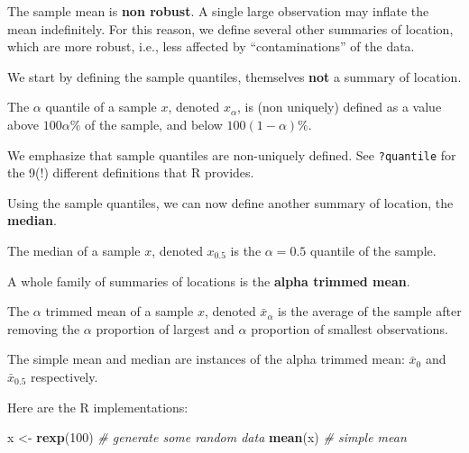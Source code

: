 \documentclass[]{book}
\newenvironment{Shaded}{\begin{snugshade}}{\end{snugshade}}
\newcommand{\KeywordTok}[1]{\textcolor[rgb]{0.13,0.29,0.53}{\textbf{#1}}}
\newcommand{\DecValTok}[1]{\textcolor[rgb]{0.00,0.00,0.81}{#1}}
\newcommand{\StringTok}[1]{\textcolor[rgb]{0.31,0.60,0.02}{#1}}
\newcommand{\CommentTok}[1]{\textcolor[rgb]{0.56,0.35,0.01}{\textit{#1}}}
\newcommand{\NormalTok}[1]{#1}
\theoremstyle{definition}
\theoremstyle{definition}
\theoremstyle{definition}
\theoremstyle{remark}
\let\BeginKnitrBlock\begin \let\EndKnitrBlock\end
\begin{document}
The sample mean is \textbf{non robust}. A single large observation may
inflate the mean indefinitely. For this reason, we define several other
summaries of location, which are more robust, i.e., less affected by
``contaminations'' of the data.

We start by defining the sample quantiles, themselves \textbf{not} a
summary of location.

\BeginKnitrBlock{definition}[Quantiles]
\protect\hypertarget{def:unnamed-chunk-99}{}{\label{def:unnamed-chunk-99}
{} }The \(\alpha\) quantile of a sample \(x\),
denoted \(x_\alpha\), is (non uniquely) defined as a value above
\(100 \alpha \%\) of the sample, and below \(100 (1-\alpha) \%\).
\EndKnitrBlock{definition}

We emphasize that sample quantiles are non-uniquely defined. See
\texttt{?quantile} for the 9(!) different definitions that R provides.

Using the sample quantiles, we can now define another summary of
location, the \textbf{median}.

\BeginKnitrBlock{definition}[Median]
\protect\hypertarget{def:unnamed-chunk-100}{}{\label{def:unnamed-chunk-100}
{} }The median of a sample \(x\), denoted
\(x_{0.5}\) is the \(\alpha=0.5\) quantile of the sample.
\EndKnitrBlock{definition}

A whole family of summaries of locations is the \textbf{alpha trimmed
mean}.

\BeginKnitrBlock{definition}[Alpha Trimmed Mean]
\protect\hypertarget{def:unnamed-chunk-101}{}{\label{def:unnamed-chunk-101}
{} }The \(\alpha\) trimmed mean of a
sample \(x\), denoted \(\bar x_\alpha\) is the average of the sample
after removing the \(\alpha\) proportion of largest and \(\alpha\)
proportion of smallest observations.
\EndKnitrBlock{definition}

The simple mean and median are instances of the alpha trimmed mean:
\(\bar x_0\) and \(\bar x_{0.5}\) respectively.

Here are the R implementations:

\begin{Shaded}
\begin{Highlighting}[]
\NormalTok{x <-}\StringTok{ }\KeywordTok{rexp}\NormalTok{(}\DecValTok{100}\NormalTok{) }\CommentTok{# generate some random data}
\KeywordTok{mean}\NormalTok{(x) }\CommentTok{# simple mean}
\end{Highlighting}
\end{Shaded}
\end{document}
